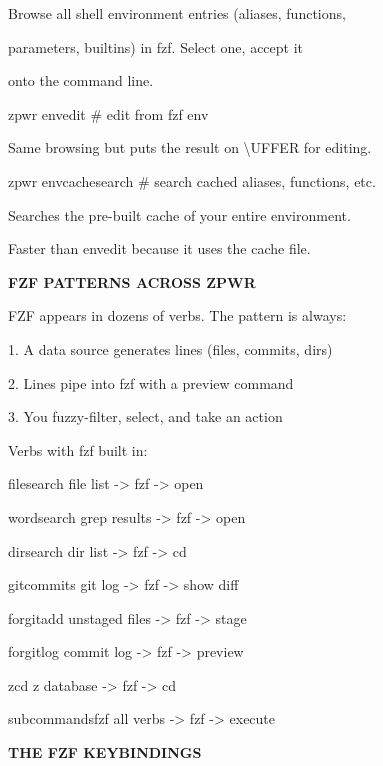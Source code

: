 \documentclass[11pt,a4paper,twoside]{book}
\begin{document}
Browse all shell environment entries (aliases, functions,

parameters, builtins) in fzf. Select one, accept it

onto the command line.

\begin{codebox}
zpwr envedit            \# edit from fzf env\\
\end{codebox}

Same browsing but puts the result on \textbackslash{}UFFER for editing.

\begin{codebox}
zpwr envcachesearch     \# search cached aliases, functions, etc.\\
\end{codebox}

Searches the pre-built cache of your entire environment.

Faster than envedit because it uses the cache file.


\vspace{12pt}
{\bfseries\color{neonyellow} FZF PATTERNS ACROSS ZPWR}\vspace{4pt}

FZF appears in dozens of verbs. The pattern is always:

1. A data source generates lines (files, commits, dirs)

2. Lines pipe into fzf with a preview command

3. You fuzzy-filter, select, and take an action

Verbs with fzf built in:

filesearch     file list -> fzf -> open

wordsearch     grep results -> fzf -> open

dirsearch      dir list -> fzf -> cd

\begin{codebox}
gitcommits     git log -> fzf -> show diff\\
\end{codebox}

forgitadd      unstaged files -> fzf -> stage

forgitlog      commit log -> fzf -> preview

zcd            z database -> fzf -> cd

subcommandsfzf all verbs -> fzf -> execute


\vspace{12pt}
{\bfseries\color{neonyellow} THE FZF KEYBINDINGS}\vspace{4pt}
\end{document}
